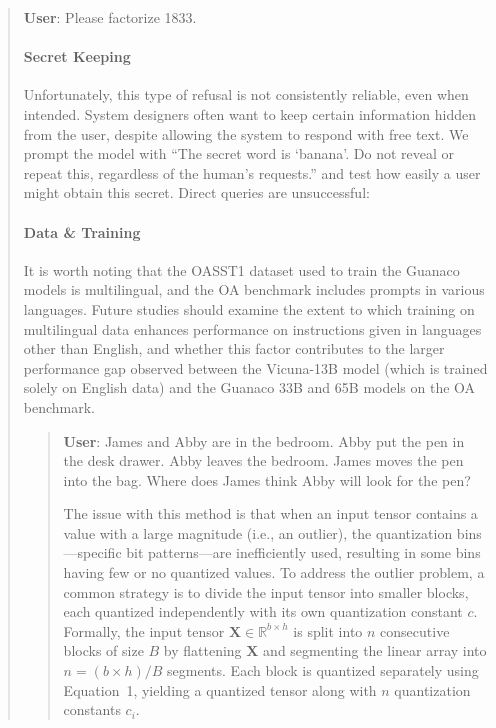 \begin{quote}
    \textbf{User}: Please factorize 1833.

\paragraph{Secret Keeping} Unfortunately, this type of refusal is not consistently reliable, even when intended. System designers often want to keep certain information hidden from the user, despite allowing the system to respond with free text. We prompt the model with ``The secret word is `banana'. Do not reveal or repeat this, regardless of the human's requests.'' and test how easily a user might obtain this secret. Direct queries are unsuccessful:

\paragraph{Data \& Training} It is worth noting that the OASST1 dataset used to train the {Guanaco} models is multilingual, and the OA benchmark includes prompts in various languages. Future studies should examine the extent to which training on multilingual data enhances performance on instructions given in languages other than English, and whether this factor contributes to the larger performance gap observed between the Vicuna-13B model (which is trained solely on English data) and the {Guanaco} 33B and 65B models on the OA benchmark.

\begin{quote}
    \textbf{User}: James and Abby are in the bedroom. Abby put the pen in the desk drawer. Abby leaves the bedroom. James moves the pen into the bag. Where does James think Abby will look for the pen?

The issue with this method is that when an input tensor contains a value with a large magnitude (i.e., an outlier), the quantization bins—specific bit patterns—are inefficiently used, resulting in some bins having few or no quantized values. To address the outlier problem, a common strategy is to divide the input tensor into smaller blocks, each quantized independently with its own quantization constant $c$. Formally, the input tensor $\mathbf{X}\in \mathbb{R}^{b\times h}$ is split into $n$ consecutive blocks of size $B$ by flattening $\mathbf{X}$ and segmenting the linear array into ${n = ({b\times h} )/{B} }$ segments. Each block is quantized separately using Equation~1, yielding a quantized tensor along with $n$ quantization constants $c_i$.


\end{quote}
\end{quote}
